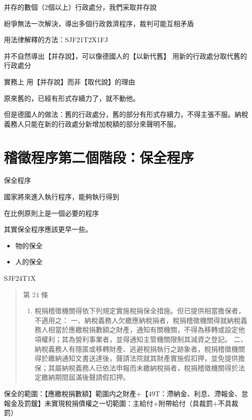 \documentclass[]{ctexbook}
\providecommand{\tightlist}{%
  \setlength{\itemsep}{0pt}\setlength{\parskip}{0pt}}
\begin{document}
并存的數個（2個以上）行政處分，我們采取并存說

紛爭無法一次解決，導出多個行政救濟程序，裁判可能互相矛盾

用法律解釋的方法：SJF21T2X1FJ

并不自然導出【并存說】，可以像德國人的【以新代舊】
用新的行政處分取代舊的行政處分

實務上 用【并存說】而非【取代說】的理由

原來舊的，已經有形式存續力了，就不動他。

但是德國人的做法：舊的行政處分，舊的部分有形式存續力，不得主張不服。納稅義務人只能在新的行政處分新增加稅額的部分來聲明不服。

\hypertarget{ux7a3dux5fb5ux7a0bux5e8fux7b2cux4e8cux500bux968eux6bb5ux4fddux5168ux7a0bux5e8f}{%
\section{稽徵程序第二個階段：保全程序}\label{ux7a3dux5fb5ux7a0bux5e8fux7b2cux4e8cux500bux968eux6bb5ux4fddux5168ux7a0bux5e8f}}

保全程序

國家將來進入執行程序，能夠執行得到

在比例原則上是一個必要的程序

其實保全程序應該更早一些。

\begin{itemize}
\tightlist
\item
  物的保全
\item
  人的保全
\end{itemize}

SJF24T1X

\begin{quote}
第 24 條

\begin{enumerate}
\def\labelenumi{\arabic{enumi}.}
\tightlist
\item
  稅捐稽徵機關得依下列規定實施稅捐保全措施。但已提供相當擔保者，不適用之：
  一、納稅義務人欠繳應納稅捐者，稅捐稽徵機關得就納稅義務人相當於應繳稅捐數額之財產，通知有關機關，不得為移轉或設定他項權利；其為營利事業者，並得通知主管機關限制其減資之登記。
  二、納稅義務人有隱匿或移轉財產、逃避稅捐執行之跡象者，稅捐稽徵機關得於繳納通知文書送達後，聲請法院就其財產實施假扣押，並免提供擔保；其屬納稅義務人已依法申報而未繳納稅捐者，稅捐稽徵機關得於法定繳納期間屆滿後聲請假扣押。
\end{enumerate}
\end{quote}

保全的範圍：【應繳稅捐數額】範圍内之財產+【49T：滯納金、利息、滯報金、怠報金及罰鍰】未實現稅捐債權之一切範圍：主給付+附帶給付（具裁罰+不具裁罰）
\end{document}
